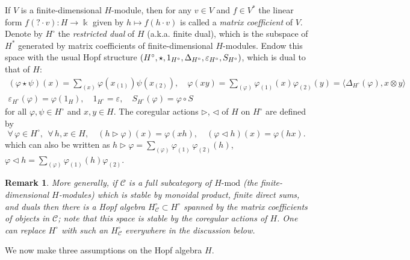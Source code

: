 \documentclass[11pt]{amsart}
\newtheorem{remark}[teo]{Remark}
\begin{document}
\smallskip

\indent If $V$ is a finite-dimensional $H$-module, then for any $v \in V$ and $f \in V^*$ the linear form $f(? \cdot v) : H \to \Bbbk$ given by $h \mapsto f(h \cdot v)$ is called a {\em matrix coefficient} of $V$. Denote by $H^{\circ}$ the {\em restricted dual} of $H$ (a.k.a. finite dual), which is the subspace of $H^*$ generated by matrix coefficients of finite-dimensional $H$-modules. Endow this space with the usual Hopf structure $(H^\circ,\star,{\rm 1}_{H^\circ},\Delta_{H^\circ},\varepsilon_{H^\circ},S_{H^\circ})$, which is dual to that of $H$:
\begin{equation}\label{usualHopfDual}
\begin{array}{c}
(\varphi \star \psi)(x) = \sum_{(x)}\varphi(x_{(1)}) \psi(x_{(2)}), \quad \varphi(xy) = \sum_{(\varphi)}\varphi_{(1)}(x) \varphi_{(2)}(y) = \bigl\langle \Delta_{H^{\circ}}(\varphi), x\otimes y \bigr\rangle\\[.3em] \varepsilon_{H^\circ}(\varphi) = \varphi(1_H), \quad 1_{H^\circ} = \varepsilon, \quad S_{H^\circ}(\varphi) = \varphi \circ S
\end{array}
\end{equation}
for all $\varphi,\psi \in H^\circ$ and $x,y \in H$. The coregular actions $\rhd$, $\lhd$ of $H$ on $H^\circ$ are defined by
\begin{equation}\label{coregActions}
\forall \, \varphi \in H^\circ, \:\: \forall \, h,x \in H, \quad
(h \rhd \varphi)(x) = \varphi(xh), \quad (\varphi \lhd h)(x) = \varphi(hx).
\end{equation}
which can also be written as $h \rhd \varphi =  \textstyle \sum_{(\varphi)}\varphi_{(1)}\,\varphi_{(2)}(h)$, $\varphi \lhd h =  \textstyle \sum_{(\varphi)}\varphi_{(1)}(h)\varphi_{(2)}$.

\begin{remark}\label{remarkRestDualForC}
{\em More generally, if $\mathcal{C}$ is a full subcategory of $H\text{-}\mathrm{mod}$ (the finite-dimensional $H$-modules) which is stable by monoidal product, finite direct sums, and duals then there is a Hopf algebra $H^\circ_{\mathcal{C}} \subset H^\circ$ spanned by the matrix coefficients of objects in $\mathcal{C}$; note that this space is stable by the coregular actions of $H$. One can replace $H^\circ$ with such an $H^\circ_{\mathcal{C}}$ everywhere in the discussion below.}
\end{remark}

\indent We now make three assumptions on the Hopf algebra $H$.
\end{document}
